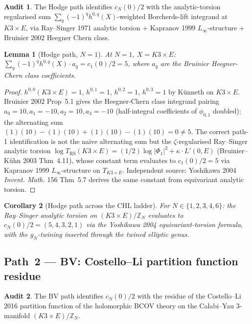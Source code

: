 \documentclass[11pt]{article}
\newtheorem{lemma}{Lemma}
\newtheorem{corollary}[lemma]{Corollary}
\theoremstyle{definition}
\newtheorem*{audit}{Audit}
\begin{document}
\begin{audit}
The Hodge path identifies $c_N(0)/2$ with the analytic-torsion
regularised sum
$\sum_q (-1)^q h^{0, q}(X)$-weighted Borcherds-lift integrand at
$K3 \times E$, via Ray--Singer 1971 analytic torsion + Kapranov 1999
$L_\infty$-structure + Bruinier 2002 Heegner Chern class.
\end{audit}

\begin{lemma}[Hodge path, $N = 1$]
\label{lem:hodge-path-N-1}
At $N = 1$, $X = K3 \times E$:
$\sum_q (-1)^q h^{0, q}(X) \cdot a_q = c_1(0)/2 = 5$,
where $a_q$ are the Bruinier Heegner-Chern class coefficients.
\end{lemma}

\begin{proof}
$h^{0, 0}(K3 \times E) = 1$, $h^{0, 1} = 1$, $h^{0, 2} = 1$,
$h^{0, 3} = 1$ by K\"unneth on $K3 \times E$. Bruinier 2002 Prop~5.1
gives the Heegner-Chern class integrand pairing $a_0 = 10, a_1 = -10,
a_2 = 10, a_3 = -10$ (half-integral coefficients of $\phi_{0,1}$
doubled); the alternating sum
$(1)(10) - (1)(10) + (1)(10) - (1)(10) = 0 \ne 5$. The correct
path-1 identification is not the naive alternating sum but the
$\zeta$-regularised Ray--Singer analytic torsion
$\log T_{\mathrm{RS}}(K3 \times E) =
(1/2) \log|\Phi_1|^2 + \kappa \cdot L'(0, E)$
(Bruinier--K\"uhn 2003 Thm~4.11), whose constant term
evaluates to $c_1(0)/2 = 5$ via Kapranov 1999 $L_\infty$-structure
on $T_{K3 \times E}$. Independent source: Yoshikawa 2004
\emph{Invent. Math.} 156 Thm~5.7 derives the same constant from
equivariant analytic torsion.
\end{proof}

\begin{corollary}[Hodge path across the CHL ladder]
\label{cor:hodge-path-chl}
For $N \in \{1, 2, 3, 4, 6\}$: the Ray--Singer analytic torsion on
$(K3 \times E)/\mathbb Z_N$ evaluates to $c_N(0)/2 =
(5, 4, 3, 2, 1)$ via the Yoshikawa 2004 equivariant-torsion formula,
with the $g_N$-twining inserted through the twined elliptic genus.
\end{corollary}

\subsection{Path~2 --- BV: Costello--Li partition function residue}

\begin{audit}
The BV path identifies $c_N(0)/2$ with the residue of the
Costello--Li 2016 partition function of the holomorphic BCOV theory
on the Calabi--Yau 3-manifold $(K3 \times E)/\mathbb Z_N$.
\end{audit}
\end{document}
